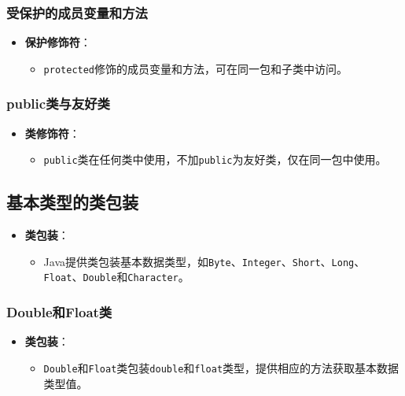 \documentclass[a4paper, 10pt]{ctexart}
\begin{document}
\subsubsection{受保护的成员变量和方法}
\begin{itemize}
  \item \textbf{保护修饰符}：
  \begin{itemize}
    \item \texttt{protected}修饰的成员变量和方法，可在同一包和子类中访问。
  \end{itemize}
\end{itemize}

\subsubsection{public类与友好类}
\begin{itemize}
  \item \textbf{类修饰符}：
  \begin{itemize}
    \item \texttt{public}类在任何类中使用，不加\texttt{public}为友好类，仅在同一包中使用。
  \end{itemize}
\end{itemize}

\subsection{基本类型的类包装}
\begin{itemize}
  \item \textbf{类包装}：
  \begin{itemize}
    \item Java提供类包装基本数据类型，如\texttt{Byte}、\texttt{Integer}、\texttt{Short}、\texttt{Long}、\texttt{Float}、\texttt{Double}和\texttt{Character}。
  \end{itemize}
\end{itemize}

\subsubsection{Double和Float类}
\begin{itemize}
  \item \textbf{类包装}：
  \begin{itemize}
    \item \texttt{Double}和\texttt{Float}类包装\texttt{double}和\texttt{float}类型，提供相应的方法获取基本数据类型值。
  \end{itemize}
\end{itemize}
\end{document}
